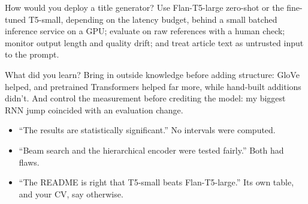 \begin{iq}{How would you deploy a title generator?}
Use Flan-T5-large zero-shot or the fine-tuned T5-small, depending on the latency budget, behind a small batched inference service on a GPU; evaluate on raw references with a human check; monitor output length and quality drift; and treat article text as untrusted input to the prompt.
\end{iq}

\begin{iq}{What did you learn?}
Bring in outside knowledge before adding structure: GloVe helped, and pretrained Transformers helped far more, while hand-built additions didn't. And control the measurement before crediting the model: my biggest RNN jump coincided with an evaluation change.
\end{iq}

\begin{bugfix}
\begin{itemize}
  \item ``The results are statistically significant.'' No intervals were computed.
  \item ``Beam search and the hierarchical encoder were tested fairly.'' Both had flaws.
  \item ``The README is right that T5-small beats Flan-T5-large.'' Its own table, and your CV, say otherwise.
\end{itemize}
\end{bugfix}
